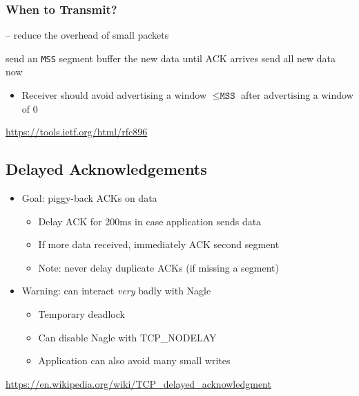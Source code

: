 \subsubsection{When to Transmit?}
\begin{algorithm}[H]
    \caption[Nagle's Algorithm]{ -- reduce the overhead of small packets}
    \label{alg:nagle}
    \begin{algorithmic}[1]
        \State send an \texttt{MSS} segment
        \Else
        \State buffer the new data until ACK arrives
        \Else
        \State send all new data now
        \EndIf
        \EndIf
    \end{algorithmic}
\end{algorithm}
\begin{itemize}[nosep]
    \item Receiver should avoid advertising a window $\leq\texttt{MSS}$ after advertising a window of 0
\end{itemize}
\url{https://tools.ietf.org/html/rfc896}

\subsection{Delayed Acknowledgements}
\begin{itemize}[nosep]
    \item Goal: piggy-back ACKs on data
          \begin{itemize}[nosep]
              \item Delay ACK for 200ms in case application sends data
              \item If more data received, immediately ACK second segment
              \item Note: never delay duplicate ACKs (if missing a segment)
          \end{itemize}
    \item Warning: can interact \emph{very} badly with Nagle
          \begin{itemize}[nosep]
              \item Temporary deadlock
              \item Can disable Nagle with TCP\_NODELAY
              \item Application can also avoid many small writes
          \end{itemize}
\end{itemize}
\url{https://en.wikipedia.org/wiki/TCP_delayed_acknowledgment}

